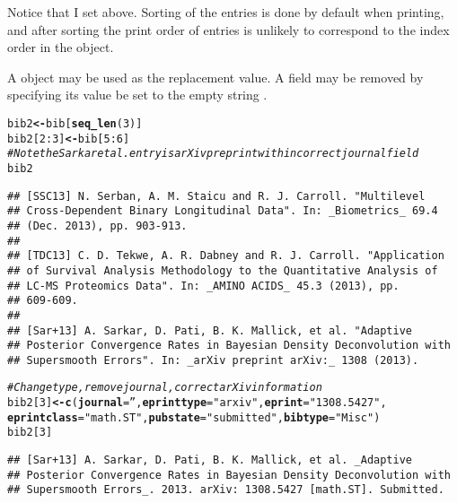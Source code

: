 \documentclass[article]{jss}\usepackage[]{graphicx}\usepackage[]{color}
\makeatletter
\newcommand{\hlnum}[1]{\textcolor[rgb]{0.125,0.125,1}{#1}}%
\newcommand{\hlstr}[1]{\textcolor[rgb]{0.125,0.125,1}{#1}}%
\newcommand{\hlcom}[1]{\textcolor[rgb]{1,0,0.753}{\textit{#1}}}%
\newcommand{\hlopt}[1]{\textcolor[rgb]{0.251,0.251,0.282}{#1}}%
\newcommand{\hlstd}[1]{\textcolor[rgb]{0.251,0.251,0.282}{#1}}%
\newcommand{\hlkwb}[1]{\textcolor[rgb]{0.439,0.251,1}{\textbf{#1}}}%
\newcommand{\hlkwc}[1]{\textcolor[rgb]{0.529,0,0.184}{\textbf{#1}}}%
\newcommand{\hlkwd}[1]{\textcolor[rgb]{0.251,0.251,0.282}{\textbf{#1}}}%
\newenvironment{kframe}{%
 \def\at@end@of@kframe{}%
 \ifinner\ifhmode%
  \def\at@end@of@kframe{\end{minipage}}%
  \begin{minipage}{\columnwidth}%
 \fi\fi%
 \def\FrameCommand##1{\hskip\@totalleftmargin \hskip-\fboxsep
 \colorbox{shadecolor}{##1}\hskip-\fboxsep
     \hskip-\linewidth \hskip-\@totalleftmargin \hskip\columnwidth}%
 \MakeFramed {\advance\hsize-\width
   \@totalleftmargin\z@ \linewidth\hsize
   \@setminipage}}%
 {\par\unskip\endMakeFramed%
 \at@end@of@kframe}
\newenvironment{knitrout}{}{} %
\makeatother
\begin{document}
Notice that I set  above.  Sorting of the entries is done by default when printing, and after sorting the print order of entries is unlikely to correspond to the index order in the  object.  

A  object may be used as the replacement value.  A field may be removed by specifying its value be
set to the empty string .
\begin{knitrout}
\color{fgcolor}\begin{kframe}
\begin{alltt}
\hlstd{bib2} \hlkwb{<-} \hlstd{bib[}\hlkwd{seq_len}\hlstd{(}\hlnum{3}\hlstd{)]}
\hlstd{bib2[}\hlnum{2}\hlopt{:}\hlnum{3}\hlstd{]} \hlkwb{<-} \hlstd{bib[}\hlnum{5}\hlopt{:}\hlnum{6}\hlstd{]}
\hlcom{# Note the Sarkar et al. entry is arXiv preprint with incorrect journal field}
\hlstd{bib2}
\end{alltt}
\begin{verbatim}
## [SSC13] N. Serban, A. M. Staicu and R. J. Carroll. "Multilevel
## Cross-Dependent Binary Longitudinal Data". In: _Biometrics_ 69.4
## (Dec. 2013), pp. 903-913.
## 
## [TDC13] C. D. Tekwe, A. R. Dabney and R. J. Carroll. "Application
## of Survival Analysis Methodology to the Quantitative Analysis of
## LC-MS Proteomics Data". In: _AMINO ACIDS_ 45.3 (2013), pp.
## 609-609.
## 
## [Sar+13] A. Sarkar, D. Pati, B. K. Mallick, et al. "Adaptive
## Posterior Convergence Rates in Bayesian Density Deconvolution with
## Supersmooth Errors". In: _arXiv preprint arXiv:_ 1308 (2013).
\end{verbatim}
\begin{alltt}
\hlcom{# Change type, remove journal, correct arXiv information}
\hlstd{bib2[}\hlnum{3}\hlstd{]} \hlkwb{<-} \hlkwd{c}\hlstd{(}\hlkwc{journal}\hlstd{=}\hlstr{''}\hlstd{,} \hlkwc{eprinttype} \hlstd{=} \hlstr{"arxiv"}\hlstd{,} \hlkwc{eprint} \hlstd{=} \hlstr{"1308.5427"}\hlstd{,}
           \hlkwc{eprintclass} \hlstd{=} \hlstr{"math.ST"}\hlstd{,} \hlkwc{pubstate} \hlstd{=} \hlstr{"submitted"}\hlstd{,} \hlkwc{bibtype} \hlstd{=} \hlstr{"Misc"}\hlstd{)}
\hlstd{bib2[}\hlnum{3}\hlstd{]}
\end{alltt}
\begin{verbatim}
## [Sar+13] A. Sarkar, D. Pati, B. K. Mallick, et al. _Adaptive
## Posterior Convergence Rates in Bayesian Density Deconvolution with
## Supersmooth Errors_. 2013. arXiv: 1308.5427 [math.ST]. Submitted.
\end{verbatim}
\end{kframe}
\end{knitrout}
\end{document}
